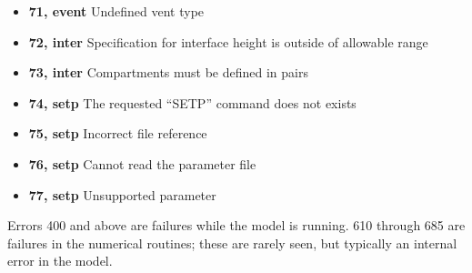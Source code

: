 \begin{itemize}
\item \textbf{71, event} Undefined vent type
\item \textbf{72, inter} Specification for interface height is outside of allowable range
\item \textbf{73, inter} Compartments must be defined in pairs
\item \textbf{74, setp} The requested “SETP” command does not exists
\item \textbf{75, setp} Incorrect file reference
\item \textbf{76, setp} Cannot read the parameter file
\item \textbf{77, setp} Unsupported parameter
\end{itemize}

Errors 400 and above are failures while the model is running. 610 through 685 are failures in the numerical routines; these are rarely seen, but typically an internal error in the model.



